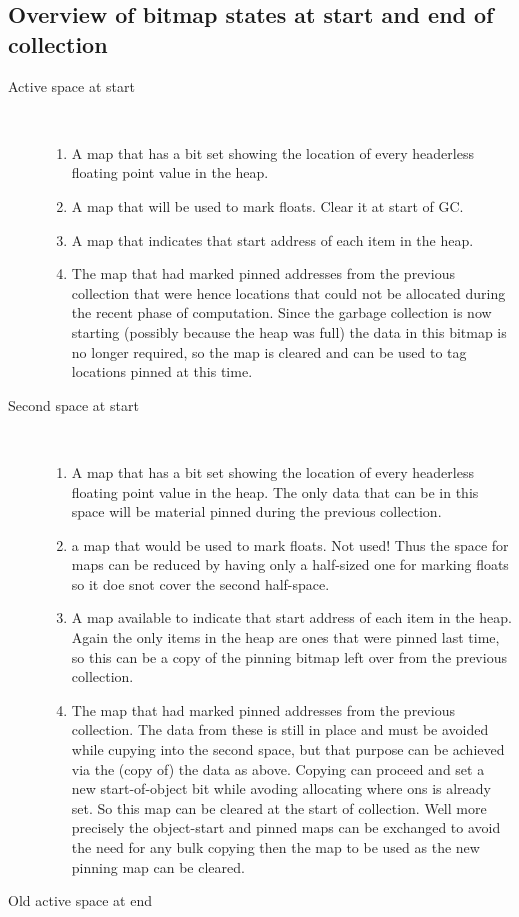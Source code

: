 \subsection{Overview of bitmap states at start and end of collection}
\begin{description}
\item[Active space at start]
~

\begin{enumerate}
\item A map that has a bit set showing the location of every
headerless floating point value in the heap.
\item A map that will be used to mark floats. Clear it at start of GC.
\item A map that indicates that start address of each item in the heap.
\item The map that had marked pinned addresses from the previous
collection that were hence locations that could not be allocated
during the recent phase of computation. Since the garbage collection is
now starting (possibly because the heap was full) the data in this bitmap
is no longer required, so the map is cleared and can be used to tag
locations pinned at this time.
\end{enumerate}
\item[Second space at start]
~

\begin{enumerate}
\item A map that has a bit set showing the location of every
headerless floating point value in the heap. The only data that
can be in this space will be material pinned during the previous
collection.
\item a map that would be used to mark floats. Not used! Thus the
space for maps can be reduced by having only a half-sized one for
marking floats so it doe snot cover the second half-space.
\item A map available to indicate that start address of each item in the heap.
Again the only items in the heap are ones that were pinned last time, so this
can be a copy of the pinning bitmap left over from the previous collection.
\item The map that had marked pinned addresses from the previous
collection. The data from these is still in place and must be avoided while
cupying into the second space, but that purpose can be achieved via the
(copy of) the data as above. Copying can proceed and set a new start-of-object
bit while avoding allocating where ons is already set. So this map can be
cleared at the start of collection. Well more precisely the object-start
and pinned maps can be exchanged to avoid the need for any bulk copying then
the map to be used as the new pinning map can be cleared.
\end{enumerate}
\item[Old active space at end]
~


\end{description}
